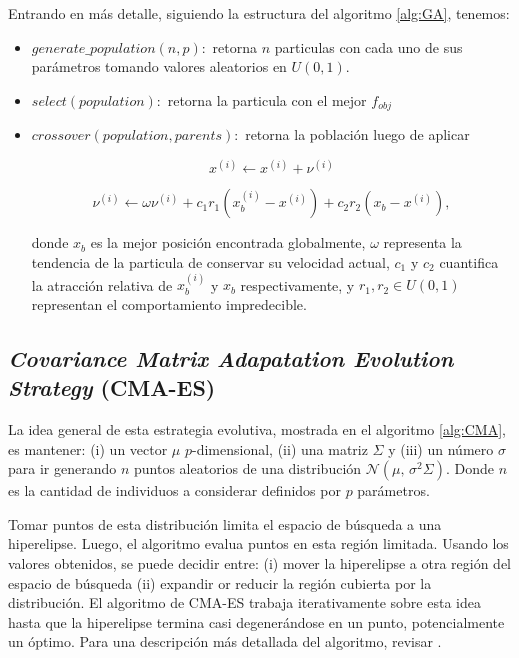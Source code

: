 Entrando en más detalle, siguiendo la estructura del algoritmo \ref{alg:GA}, tenemos:

\begin{itemize}

\item $generate\_population(n, p):$ retorna $n$ particulas con cada uno de
      sus parámetros tomando valores aleatorios en $U(0, 1)$.

\item $select(population):$ retorna la particula con el mejor $f_{obj}$

\item $crossover(population, parents):$ retorna la población luego de aplicar 
    
  \begin{equation}
    x^{(i)} \gets x^{(i)} + \nu^{(i)}
  \label{pso-pos}
  \end{equation}

  \begin{equation}
    \nu^{(i)} \gets \omega \nu^{(i)} + c_1 r_1 \left(x_{b}^{(i)} - x^{(i)}
    \right) + c_2 r_2 \left(x_{b} - x^{(i)} \right),
  \label{pso-speed}
  \end{equation}
    

  donde $x_{b}$  es la mejor posición encontrada globalmente, 
  $\omega$ representa la tendencia de la particula de conservar su velocidad actual,
  $c_1$ y $c_2$ cuantifica la atracción relativa de $x_{b}^{(i)}$ y $x_{b}$ respectivamente, 
  y $r_1, r_2 \in U(0, 1)$ representan el comportamiento impredecible.

\end{itemize}


\subsection{\emph{Covariance Matrix Adapatation Evolution Strategy} (CMA-ES)}

La idea general de esta estrategia evolutiva, mostrada en el algoritmo
\ref{alg:CMA}, es mantener:
(i) un vector $\mu$ $p$-dimensional,
(ii) una matriz $\Sigma$ y
(iii) un número $\sigma$ para ir generando $n$ puntos aleatorios de una
distribución $\mathcal{N}(\mu,\,\sigma^{2} \Sigma)$.
Donde $n$ es la cantidad de individuos a considerar definidos por $p$
parámetros.


Tomar puntos de esta distribución limita el espacio de búsqueda a una
hiperelipse.
Luego, el algoritmo evalua puntos en esta región limitada.
Usando los valores obtenidos, se puede decidir entre:
(i) mover la hiperelipse a otra región del espacio de búsqueda
(ii) expandir or reducir la región cubierta por la distribución.
El algoritmo de CMA-ES trabaja iterativamente sobre esta idea hasta que la
hiperelipse termina casi degenerándose en un punto, 
potencialmente un óptimo.
Para una descripción más detallada del algoritmo, revisar \citep{Mykel2019, Hansen2016}.

